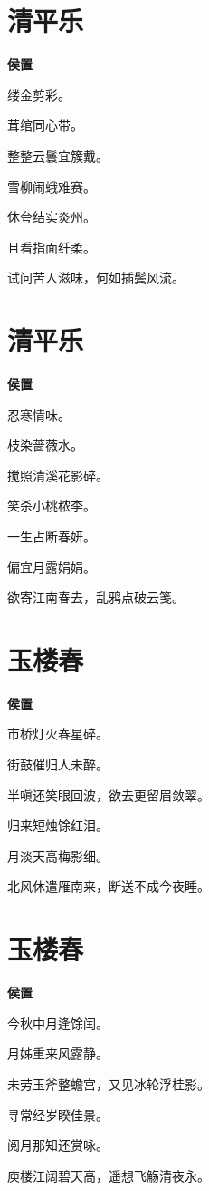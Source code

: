 \documentclass[12pt,a4paper]{ctexbook}
\begin{document}
\section{清平乐}
\textbf{侯置}\par\vspace{0.5em}
缕金剪彩。\par
茸绾同心带。\par
整整云鬟宜簇戴。\par
雪柳闹蛾难赛。\par
休夸结实炎州。\par
且看指面纤柔。\par
试问苦人滋味，何如插鬓风流。\par

\section{清平乐}
\textbf{侯置}\par\vspace{0.5em}
忍寒情味。\par
枝染蔷薇水。\par
搅照清溪花影碎。\par
笑杀小桃秾李。\par
一生占断春妍。\par
偏宜月露娟娟。\par
欲寄江南春去，乱鸦点破云笺。\par

\section{玉楼春}
\textbf{侯置}\par\vspace{0.5em}
市桥灯火春星碎。\par
街鼓催归人未醉。\par
半嗔还笑眼回波，欲去更留眉敛翠。\par
归来短烛馀红泪。\par
月淡天高梅影细。\par
北风休遣雁南来，断送不成今夜睡。\par

\section{玉楼春}
\textbf{侯置}\par\vspace{0.5em}
今秋中月逢馀闰。\par
月姊重来风露静。\par
未劳玉斧整蟾宫，又见冰轮浮桂影。\par
寻常经岁睽佳景。\par
阅月那知还赏咏。\par
庾楼江阔碧天高，遥想飞觞清夜永。\par
\end{document}
